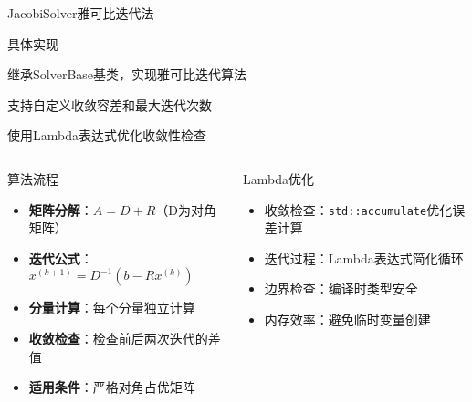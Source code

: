 \documentclass[UTF8,aspectratio=169]{beamer}
\begin{document}
\begin{frame}{JacobiSolver雅可比迭代法}
    \begin{ytublock}{具体实现}
        \item 继承SolverBase基类，实现雅可比迭代算法
        \item 支持自定义收敛容差和最大迭代次数
        \item 使用Lambda表达式优化收敛性检查
    \end{ytublock}

    \begin{columns}
        \begin{block}{算法流程}
            \begin{itemize}
                \item \textbf{矩阵分解}：$A = D + R$（D为对角矩阵）
                \item \textbf{迭代公式}：$x^{(k+1)} = D^{-1}(b - R x^{(k)})$
                \item \textbf{分量计算}：每个分量独立计算
                \item \textbf{收敛检查}：检查前后两次迭代的差值
                \item \textbf{适用条件}：严格对角占优矩阵
            \end{itemize}
        \end{block}

        \begin{block}{Lambda优化}
            \begin{itemize}
                \item 收敛检查：\texttt{std::accumulate}优化误差计算
                \item 迭代过程：Lambda表达式简化循环
                \item 边界检查：编译时类型安全
                \item 内存效率：避免临时变量创建
            \end{itemize}
        \end{block}
    \end{columns}
\end{frame}
\end{document}
